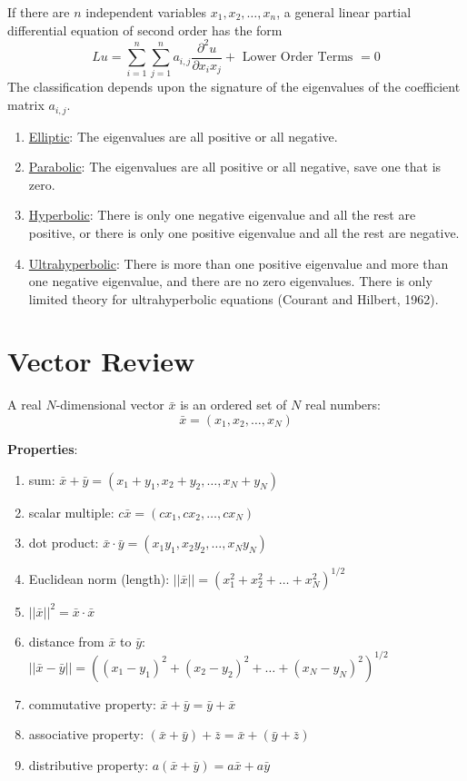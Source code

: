 \documentclass[12pt]{article}
\begin{document}
If there are $n$ independent variables $x_1, x_2 , \dots, x_n$, a general linear partial differential equation of second order has the form
%
\begin{equation}
Lu = \sum_{i=1}^n \sum_{j=1}^n a_{i,j} \frac{\partial^2 u}{\partial x_i x_j} + \text{ Lower Order Terms } = 0 \nonumber
\end{equation}
%
The classification depends upon the signature of the eigenvalues of the coefficient matrix $a_{i,j}$.
\begin{enumerate}
\item \underline{Elliptic}: The eigenvalues are all positive or all negative.
\item \underline{Parabolic}: The eigenvalues are all positive or all negative, save one that is zero.
\item \underline{Hyperbolic}: There is only one negative eigenvalue and all the rest are positive, or there is only one positive eigenvalue and all the rest are negative.
\item \underline{Ultrahyperbolic}: There is more than one positive eigenvalue and more than one negative eigenvalue, and there are no zero eigenvalues. There is only limited theory for ultrahyperbolic equations (Courant and Hilbert, 1962).
\end{enumerate}

\section{Vector Review}

A real $N$-dimensional vector $\bar{x}$ is an ordered set of $N$ real numbers:
%
\begin{equation}
\bar{x} = (x_1, x_2, \dots, x_N) \nonumber
\end{equation}

\textbf{Properties}:
%
\begin{enumerate}
\item sum: $\bar{x} + \bar{y} = (x_1 + y_1, x_2 + y_2, \dots, x_N + y_N)$
\item scalar multiple: $c\bar{x} = (cx_1, cx_2, \dots, cx_N)$
\item dot product: $\bar{x} \cdot \bar{y} = (x_1 y_1, x_2 y_2, \dots, x_N y_N)$
\item Euclidean norm (length): $||\bar{x}|| = (x_1^2 + x_2^2 + \dots + x_N^2)^{1/2}$
\item $||\bar{x}||^2 = \bar{x} \cdot \bar{x}$
\item distance from $\bar{x}$ to $\bar{y}$: $||\bar{x} - \bar{y}|| = ((x_1 - y_1)^2 + (x_2 - y_2)^2 + \dots + (x_N - y_N)^2)^{1/2}$
\item commutative property: $\bar{x} + \bar{y} = \bar{y} + \bar{x}$
\item associative property: $(\bar{x} + \bar{y}) + \bar{z} = \bar{x} + (\bar{y} + \bar{z})$
\item distributive property: $a(\bar{x} + \bar{y}) = a\bar{x} + a\bar{y}$
\end{enumerate}
\end{document}
